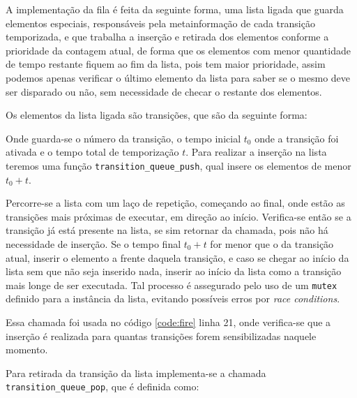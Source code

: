 A implementação da fila é feita da seguinte forma, uma lista ligada que guarda elementos especiais, responsáveis pela metainformação de cada transição temporizada, e que trabalha a inserção e retirada dos elementos conforme a prioridade da contagem atual, de forma que os elementos com menor quantidade de tempo restante fiquem ao fim da lista, pois tem maior prioridade, assim podemos apenas verificar o último elemento da lista para saber se o mesmo deve ser disparado ou não, sem necessidade de checar o restante dos elementos.

Os elementos da lista ligada são transições, que são da seguinte forma:



Onde guarda-se o número da transição, o tempo inicial $t_0$ onde a transição foi ativada e o tempo total de temporização $t$. Para realizar a inserção na lista teremos uma função \lstinline{transition_queue_push}, qual insere os elementos de menor $t_0 + t$.



Percorre-se a lista com um laço de repetição, começando ao final, onde estão as transições mais próximas de executar, em direção ao início. Verifica-se então se a transição já está presente na lista, se sim retornar da chamada, pois não há necessidade de inserção. Se o tempo final $t_0 + t$ for menor que o da transição atual, inserir o elemento a frente daquela transição, e caso se chegar ao início da lista sem que não seja inserido nada, inserir ao início da lista como a transição mais longe de ser executada. Tal processo é assegurado pelo uso de um \lstinline{mutex} definido para a instância da lista, evitando possíveis erros por \textit{race conditions}.

Essa chamada foi usada no código \ref{code:fire} linha 21, onde verifica-se que a inserção é realizada para quantas transições forem sensibilizadas naquele momento.

Para retirada da transição da lista implementa-se a chamada \lstinline{transition_queue_pop}, que é definida como:



